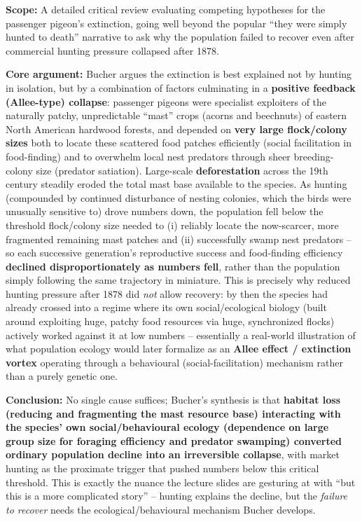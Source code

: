 \documentclass[11pt,a4paper]{article}
\begin{document}
\begin{papbox}[title={Paper Summary: Bucher, E.H.\ (1992), ``The Causes of Extinction of the Passenger Pigeon,'' \textit{Current Ornithology}, Vol.\ 9 (Springer US), pp.\ 1--36}]
\textbf{Scope:} A detailed critical review evaluating competing hypotheses for the passenger pigeon's extinction, going well beyond the popular ``they were simply hunted to death'' narrative to ask why the population failed to recover even after commercial hunting pressure collapsed after 1878.

\textbf{Core argument:} Bucher argues the extinction is best explained not by hunting in isolation, but by a combination of factors culminating in a \textbf{positive feedback (Allee-type) collapse}: passenger pigeons were specialist exploiters of the naturally patchy, unpredictable ``mast'' crops (acorns and beechnuts) of eastern North American hardwood forests, and depended on \textbf{very large flock/colony sizes} both to locate these scattered food patches efficiently (social facilitation in food-finding) and to overwhelm local nest predators through sheer breeding-colony size (predator satiation). Large-scale \textbf{deforestation} across the 19th century steadily eroded the total mast base available to the species. As hunting (compounded by continued disturbance of nesting colonies, which the birds were unusually sensitive to) drove numbers down, the population fell below the threshold flock/colony size needed to (i) reliably locate the now-scarcer, more fragmented remaining mast patches and (ii) successfully swamp nest predators -- so each successive generation's reproductive success and food-finding efficiency \textbf{declined disproportionately as numbers fell}, rather than the population simply following the same trajectory in miniature. This is precisely why reduced hunting pressure after 1878 did \emph{not} allow recovery: by then the species had already crossed into a regime where its own social/ecological biology (built around exploiting huge, patchy food resources via huge, synchronized flocks) actively worked against it at low numbers -- essentially a real-world illustration of what population ecology would later formalize as an \textbf{Allee effect / extinction vortex} operating through a behavioural (social-facilitation) mechanism rather than a purely genetic one.

\textbf{Conclusion:} No single cause suffices; Bucher's synthesis is that \textbf{habitat loss (reducing and fragmenting the mast resource base) interacting with the species' own social/behavioural ecology (dependence on large group size for foraging efficiency and predator swamping) converted ordinary population decline into an irreversible collapse}, with market hunting as the proximate trigger that pushed numbers below this critical threshold. This is exactly the nuance the lecture slides are gesturing at with ``but this is a more complicated story'' -- hunting explains the decline, but the \emph{failure to recover} needs the ecological/behavioural mechanism Bucher develops.
\end{papbox}
\end{document}
